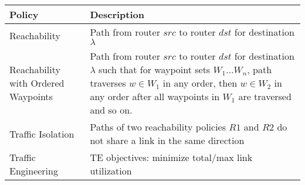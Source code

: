 \begin{table*}[thb]
\begin{small}
	\begin{center}
		\begin{tabular}{m{10em} | m{42em} } 
			Policy &  Description \\ 
			\hline
			Reachability & Path from router $src$ to router $dst$ for destination $\lambda$ \\ \hline
			Reachability with \newline Ordered Waypoints & Path from router $src$ to router $dst$ for destination $\lambda$ 
			such that for waypoint sets $W_1\ldots W_n$, path traverses $w \in W_1$ in any order, then $w \in W_2$ in any order after all waypoints in $W_1$ are traversed and so on.\\ \hline
			Traffic Isolation & Paths of two reachability policies $R1$ and $R2$ do not share a link in the same direction \\ \hline
			Traffic Engineering  & TE objectives: minimize total/max link utilization \\
		\end{tabular}
	\end{center}
	 \label{tab:policysupport} 
\end{small}
\end{table*}


